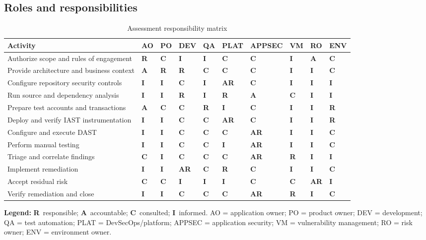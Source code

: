 \documentclass[11pt,letterpaper]{article}
\newcommand{\R}{\textbf{R}}
\newcommand{\A}{\textbf{A}}
\newcommand{\C}{\textbf{C}}
\newcommand{\I}{\textbf{I}}
\begin{document}
\begin{landscape}
\section{Roles and responsibilities}
\begin{table}[H]
\centering
\caption{Assessment responsibility matrix}
\scriptsize
\begin{tabular}{@{}L{2.15in}*{9}{C{0.55in}}@{}}
\toprule
\textbf{Activity} & \textbf{AO} & \textbf{PO} & \textbf{DEV} & \textbf{QA} & \textbf{PLAT} & \textbf{APPSEC} & \textbf{VM} & \textbf{RO} & \textbf{ENV} \\
\midrule
Authorize scope and rules of engagement & \R & \C & \I & \I & \C & \C & \I & \A & \C \\
Provide architecture and business context & \A & \R & \R & \C & \C & \C & \I & \I & \C \\
Configure repository security controls & \I & \I & \C & \I & \A\R & \C & \I & \I & \I \\
Run source and dependency analysis & \I & \I & \R & \I & \R & \A & \C & \I & \I \\
Prepare test accounts and transactions & \A & \C & \C & \R & \I & \C & \I & \I & \R \\
Deploy and verify IAST instrumentation & \I & \I & \C & \C & \A\R & \C & \I & \I & \R \\
Configure and execute DAST & \I & \I & \C & \C & \C & \A\R & \I & \I & \C \\
Perform manual testing & \I & \I & \C & \C & \I & \A\R & \I & \I & \C \\
Triage and correlate findings & \C & \I & \C & \C & \C & \A\R & \R & \I & \I \\
Implement remediation & \I & \I & \A\R & \C & \R & \C & \I & \I & \C \\
Accept residual risk & \C & \C & \I & \I & \I & \C & \C & \A\R & \I \\
Verify remediation and close & \I & \I & \C & \C & \C & \A\R & \R & \I & \C \\
\bottomrule
\end{tabular}

\vspace{4pt}
\raggedright \textbf{Legend:} \R\ responsible; \A\ accountable; \C\ consulted; \I\ informed. AO = application owner; PO = product owner; DEV = development; QA = test automation; PLAT = DevSecOps/platform; APPSEC = application security; VM = vulnerability management; RO = risk owner; ENV = environment owner.
\end{table}
\end{landscape}
\end{document}
